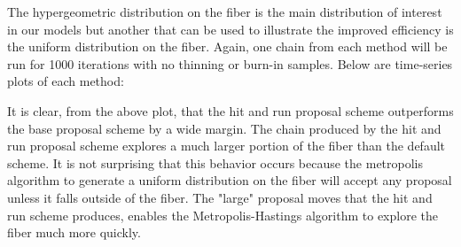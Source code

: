 \documentclass{phd}\usepackage[]{graphicx}\usepackage[]{color}
\makeatletter
\newenvironment{kframe}{%
 \def\at@end@of@kframe{}%
 \ifinner\ifhmode%
  \def\at@end@of@kframe{\end{minipage}}%
  \begin{minipage}{\columnwidth}%
 \fi\fi%
 \def\FrameCommand##1{\hskip\@totalleftmargin \hskip-\fboxsep
 \colorbox{shadecolor}{##1}\hskip-\fboxsep
     \hskip-\linewidth \hskip-\@totalleftmargin \hskip\columnwidth}%
 \MakeFramed {\advance\hsize-\width
   \@totalleftmargin\z@ \linewidth\hsize
   \@setminipage}}%
 {\par\unskip\endMakeFramed%
 \at@end@of@kframe}
\newenvironment{knitrout}{}{} %
\makeatother
\begin{document}
The hypergeometric distribution on the fiber is the main distribution of interest in our models but another that can be used to illustrate the improved efficiency is the uniform distribution on the fiber. Again, one chain from each method will be run for 1000 iterations with no thinning or burn-in samples. Below are time-series plots of each method:

\begin{knitrout}
\color{fgcolor}\begin{kframe}


{\ttfamily\noindent\bfseries{}}

{\ttfamily\noindent\bfseries\color{errorcolor}{\#\# Error in metropolis(tbl, moves, suffStats = suff\_stats, config = A, hitAndRun = TRUE, : unused arguments (suffStats = suff\_stats, config = A, hitAndRun = TRUE)}}

{\ttfamily\noindent\bfseries\color{errorcolor}{\#\# Error in algstat:::computeUProbsCpp(base\_unif\$steps): object 'base\_unif' not found}}

{\ttfamily\noindent\bfseries\color{errorcolor}{\#\# Error in algstat:::computeUProbsCpp(har\_unif\$steps): object 'har\_unif' not found}}

{\ttfamily\noindent\bfseries\color{errorcolor}{\#\# Error in eval\_tidy(xs[[i]], unique\_output): object 'base\_unif\_steps' not found}}\end{kframe}
\end{knitrout}

\begin{knitrout}
\color{fgcolor}\begin{kframe}


{\ttfamily\noindent\bfseries\color{errorcolor}{\#\# Error in ggplot(plot\_unif\_df): object 'plot\_unif\_df' not found}}\end{kframe}
\end{knitrout}

It is clear, from the above plot, that the hit and run proposal scheme outperforms the base proposal scheme by a wide margin. The chain produced by the hit and run proposal scheme explores a much larger portion of the fiber than the default scheme. It is not surprising that this behavior occurs because the metropolis algorithm to generate a uniform distribution on the fiber will accept any proposal unless it falls outside of the fiber. The "large" proposal moves that the hit and run scheme produces, enables the Metropolis-Hastings algorithm to explore the fiber much more quickly.
\end{document}
